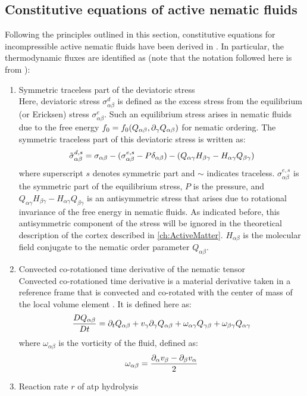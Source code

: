 \subsection{Constitutive equations of active nematic fluids}\label{subsec:constitutiveEquationsActiveNematicFluids}
Following the principles outlined in this section, constitutive equations for incompressible active nematic fluids have been derived in \cite{julicher2018hydrodynamic}. In particular, the thermodynamic fluxes are identified as (note that the notation followed here is from \cite{julicher2018hydrodynamic}):
\begin{enumerate}
    \item Symmetric traceless part of the deviatoric stress\hfill\\
    Here, deviatoric stress $\sigma^d_{\alpha\beta}$ is defined as the excess stress from the equilibrium (or Ericksen) stress $\sigma^e_{\alpha\beta}$. Such an equilibrium stress arises in nematic fluids due to the free energy $f_0 = f_0(Q_{\alpha\beta},\inlinePartial{\gamma}{Q_{\alpha\beta}})$ for nematic ordering. The symmetric traceless part of this deviatoric stress is written as:
    \begin{equation}\label{eq:introActiveNematicDeviatoricStress}
        \Tilde{\sigma}^{d,s}_{\alpha\beta} = \sigma_{\alpha\beta} - (\sigma^{e,s}_{\alpha\beta} - P\delta_{\alpha\beta}) - (Q_{\alpha\gamma}H_{\beta\gamma} - H_{\alpha\gamma}Q_{\beta\gamma})
    \end{equation}
    where superscript $s$ denotes symmetric part and $\sim$ indicates traceless. $\sigma^{e,s}_{\alpha\beta}$ is the symmetric part of the equilibrium stress, $P$ is the pressure, and $Q_{\alpha\gamma}H_{\beta\gamma} - H_{\alpha\gamma}Q_{\beta\gamma}$ is an antisymmetric stress that arises due to rotational invariance of the free energy in nematic fluids. As indicated before, this antisymmetric component of the stress will be ignored in the theoretical description of the cortex described in \autoref{ch:ActiveMatter}. $H_{\alpha\beta}$ is the molecular field conjugate to the nematic order parameter $Q_{\alpha\beta}$.
    \item Convected co-rotationed time derivative of the nematic tensor\hfill\\
    Convected co-rotationed time derivative is a material derivative taken in a reference frame that is convected and co-rotated with the center of mass of the local volume element \citep{larson1999structure}. It is defined here as:
    \begin{equation}\label{eq:introCorotateDeriveQ}
        \frac{DQ_{\alpha\beta}}{Dt} = \inlinePartial{t}{Q_{\alpha\beta}} + v_\gamma\inlinePartial{\gamma}{Q_{\alpha\beta}} + \omega_{\alpha\gamma}Q_{\gamma\beta} + \omega_{\beta\gamma}Q_{\alpha\gamma}
    \end{equation}
    where $\omega_{\alpha\beta}$ is the vorticity of the fluid, defined as:
    \begin{equation}\label{eq:introVorticityNematic}
        \omega_{\alpha\beta} = \frac{\inlinePartial{\alpha}{v_\beta} - \inlinePartial{\beta}{v_\alpha}}{2}
    \end{equation}
    \item Reaction rate $r$ of \ac{atp} hydrolysis
\end{enumerate}
